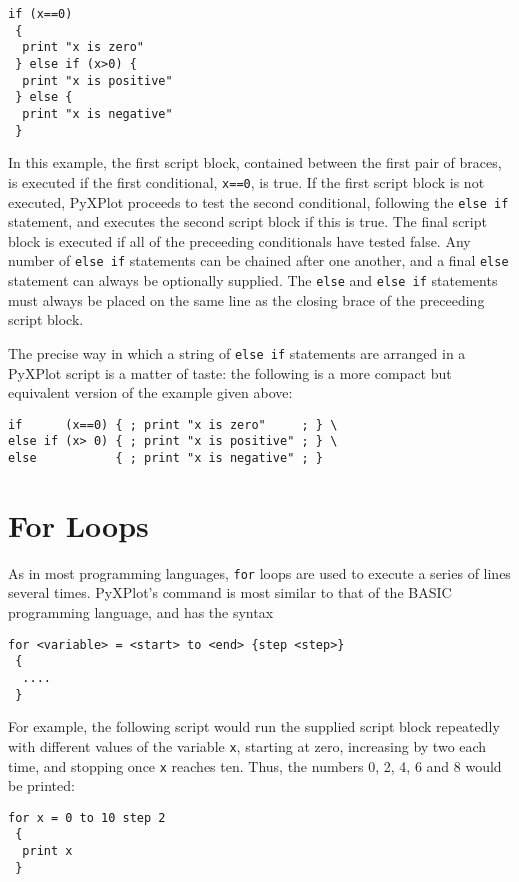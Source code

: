 \begin{verbatim}
if (x==0)
 {
  print "x is zero"
 } else if (x>0) {
  print "x is positive"
 } else {
  print "x is negative"
 }
\end{verbatim}

In this example, the first script block, contained between the first pair of
braces, is executed if the first conditional, {\tt x==0}, is true. If the first
script block is not executed, PyXPlot proceeds to test the second conditional,
following the {\tt else if} statement, and executes the second script block if
this is true. The final script block is executed if all of the preceeding
conditionals have tested false. Any number of {\tt else if} statements can be
chained after one another, and a final {\tt else} statement can always be
optionally supplied. The {\tt else} and {\tt else if} statements must always be
placed on the same line as the closing brace of the preceeding script block.

The precise way in which a string of {\tt else if} statements are arranged in a
PyXPlot script is a matter of taste: the following is a more compact but
equivalent version of the example given above:

\begin{verbatim}
if      (x==0) { ; print "x is zero"     ; } \
else if (x> 0) { ; print "x is positive" ; } \
else           { ; print "x is negative" ; }
\end{verbatim}

\section{For Loops}

As in most programming languages, {\tt for} loops are used to execute a series
of lines several times. PyXPlot's  command is most similar to that
of the BASIC programming language, and has the syntax

\begin{verbatim}
for <variable> = <start> to <end> {step <step>}
 {
  ....
 }
\end{verbatim}

\noindent For example, the following script would run the supplied script block
repeatedly with different values of the variable {\tt x}, starting at zero,
increasing by two each time, and stopping once {\tt x} reaches ten. Thus, the
numbers 0, 2, 4, 6 and 8 would be printed:

\begin{verbatim}
for x = 0 to 10 step 2
 {
  print x
 }
\end{verbatim}

